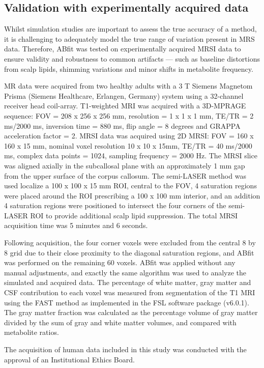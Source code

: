 \documentclass[num-refs]{wiley-article}
\begin{document}
\subsection{Validation with experimentally acquired data}
Whilst simulation studies are important to assess the true accuracy of a method, it is challenging to adequately model the true range of variation present in MRS data. Therefore, ABfit was tested on experimentally acquired MRSI data to ensure validity and robustness to common artifacts --- such as baseline distortions from scalp lipids, shimming variations and minor shifts in metabolite frequency.

MR data were acquired from two healthy adults with a 3 T Siemens Magnetom Prisma (Siemens Healthcare, Erlangen, Germany) system using a 32-channel receiver head coil-array. T1-weighted MRI was acquired with a 3D-MPRAGE sequence: FOV = 208 x 256 x 256 mm, resolution = 1 x 1 x 1 mm, TE/TR = 2 ms/2000 ms, inversion time = 880 ms, flip angle = 8 degrees and GRAPPA acceleration factor = 2. MRSI data was acquired using 2D MRSI: FOV = 160 x 160 x 15 mm, nominal voxel resolution 10 x 10 x 15mm, TE/TR = 40 ms/2000 ms, complex data points = 1024, sampling frequency = 2000 Hz. The MRSI slice was aligned axially in the subcallosal plane with an approximately 1 mm gap from the upper surface of the corpus callosum. The semi-LASER method \cite{Scheenen2008} was used localize a 100 x 100 x 15 mm ROI, central to the FOV, 4 saturation regions were placed around the ROI prescribing a 100 x 100 mm interior, and an addition 4 saturation regions were positioned to intersect the four corners of the semi-LASER ROI to provide additional scalp lipid suppression. The total MRSI acquisition time was 5 minutes and 6 seconds.

Following acquisition, the four corner voxels were excluded from the central 8 by 8 grid due to their close proximity to the diagonal saturation regions, and ABfit was performed on the remaining 60 voxels. ABfit was applied without any manual adjustments, and exactly the same algorithm was used to analyze the simulated and acquired data. The percentage of white matter, gray matter and CSF contribution to each voxel was measured from segmentation of the T1 MRI using the FAST method \cite{Zhang2001} as implemented in the FSL software package (v6.0.1). The gray matter fraction was calculated as the percentage volume of gray matter divided by the sum of gray and white matter volumes, and compared with metabolite ratios.

The acquisition of human data included in this study was conducted with the approval of an Institutional Ethics Board.
\end{document}
